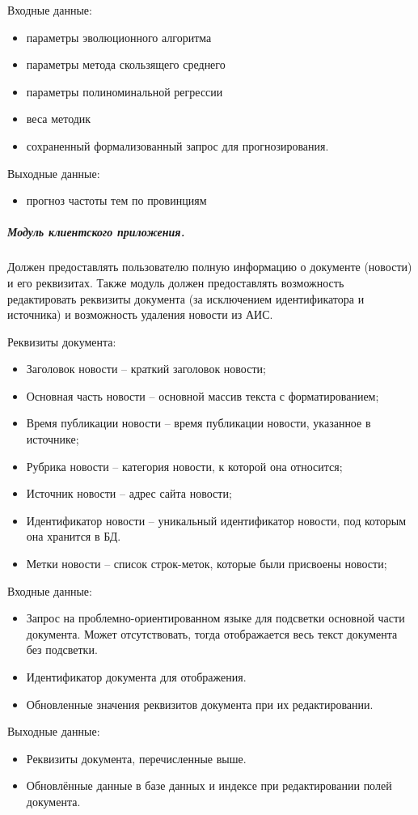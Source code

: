 Входные данные:
\begin{itemize}
\item параметры эволюционного алгоритма 
\item параметры метода скользящего среднего
\item параметры полиноминальной регрессии
\item веса методик
\item сохраненный формализованный запрос для прогнозирования.
\end{itemize}

Выходные данные:
\begin{itemize}
\item прогноз частоты тем по провинциям
\end{itemize}

\clearpage
\subparagraph{Модуль клиентского приложения.} \hfill

Должен предоставлять пользователю полную информацию о документе (новости) и его реквизитах. Также модуль должен предоставлять возможность редактировать реквизиты документа (за исключением идентификатора и источника) и возможность удаления новости из АИС.

Реквизиты документа:
\begin{itemize}
\item Заголовок новости -- краткий заголовок новости;
\item Основная часть новости -- основной массив текста с форматированием;
\item Время публикации новости -- время публикации новости, указанное в
источнике;
\item Рубрика новости -- категория новости, к которой она относится;
\item Источник новости -- адрес сайта новости;
\item Идентификатор новости -- уникальный идентификатор новости, под
которым она хранится в БД.
\item Метки новости -- список строк-меток, которые были присвоены новости;
\end{itemize}

Входные данные:
\begin{itemize}
\item Запрос на проблемно-ориентированном языке для подсветки основной части документа. Может отсутствовать, тогда отображается весь текст документа без подсветки.
\item Идентификатор документа для отображения.
\item Обновленные значения реквизитов документа при их редактировании.
\end{itemize}

Выходные данные:
\begin{itemize}
\item Реквизиты документа, перечисленные выше.
\item Обновлённые данные в базе данных и индексе при редактировании полей документа.
\end{itemize}
